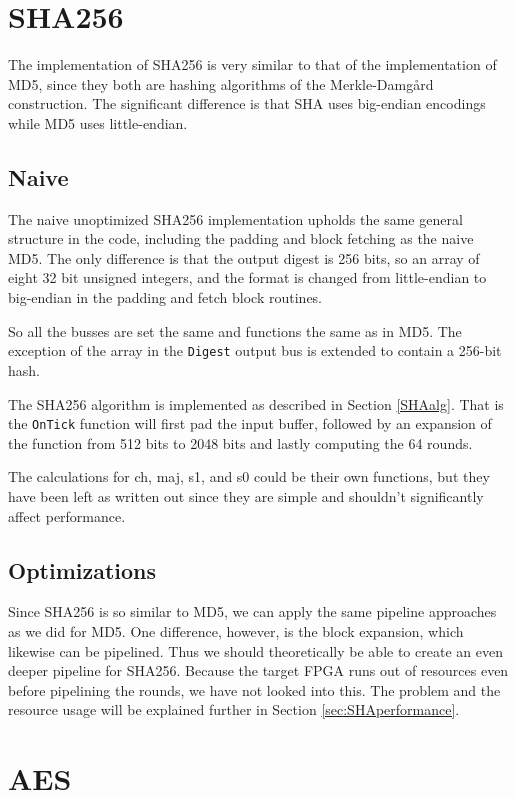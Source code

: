 \documentclass[a4paper, openany]{book}
\begin{document}
\section{SHA256}
\label{sec:orgc1c5209}
The implementation of SHA256 is very similar to that of the implementation of MD5,
since they both are hashing algorithms of the Merkle-Damgård construction.
The significant difference is that SHA uses big-endian encodings while MD5 uses little-endian.

\subsection{Naive}
\label{SHAnaive}
The naive unoptimized SHA256 implementation upholds the same general structure in the code, including the padding and block fetching as the naive MD5.
The only difference is that the output digest is 256 bits, so an array of eight 32 bit unsigned integers,
and the format is changed from little-endian to big-endian in the padding and fetch block routines.

So all the busses are set the same and functions the same as in MD5. The exception of the array in the \texttt{Digest} output bus is extended to contain a 256-bit hash.

The SHA256 algorithm is implemented as described in Section \ref{SHAalg}. That is the \texttt{OnTick} function will first pad the input buffer, followed by an expansion of the function from 512 bits to 2048 bits and lastly computing the 64 rounds.

The calculations for ch, maj, s1, and s0 could be their own functions, but they have been left as written out since they are simple and shouldn't significantly affect performance.

\subsection{Optimizations}
\label{sec:orgbe7c175}
Since SHA256 is so similar to MD5, we can apply the same pipeline approaches as we did for MD5. One difference, however, is the block expansion, which likewise can be pipelined. Thus we should theoretically be able to create an even deeper pipeline for SHA256. Because the target FPGA runs out of resources even before pipelining the rounds, we have not looked into this. The problem and the resource usage will be explained further in Section \ref{sec:SHAperformance}.
\section{AES}
\label{sec:orga1be07d}
\end{document}
